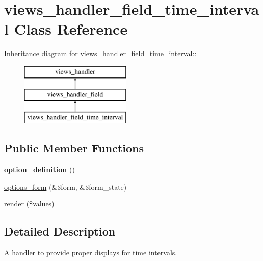\hypertarget{classviews__handler__field__time__interval}{
\section{views\_\-handler\_\-field\_\-time\_\-interval Class Reference}
\label{classviews__handler__field__time__interval}
}
Inheritance diagram for views\_\-handler\_\-field\_\-time\_\-interval::\begin{figure}[H]
\begin{center}
\leavevmode
\includegraphics[height=3cm]{classviews__handler__field__time__interval}
\end{center}
\end{figure}
\subsection*{Public Member Functions}
\begin{DoxyCompactItemize}
\item 
\hypertarget{classviews__handler__field__time__interval_ad278cd2501baa1d7b734d90e562b5731}{
{\bfseries option\_\-definition} ()}
\label{classviews__handler__field__time__interval_ad278cd2501baa1d7b734d90e562b5731}

\item 
\hyperlink{classviews__handler__field__time__interval_a3ca80ab09f90fecda4883a588dfef30d}{options\_\-form} (\&\$form, \&\$form\_\-state)
\item 
\hyperlink{classviews__handler__field__time__interval_aac98a5a54ec9f24cc730f114d2067524}{render} (\$values)
\end{DoxyCompactItemize}


\subsection{Detailed Description}
A handler to provide proper displays for time intervals. 

